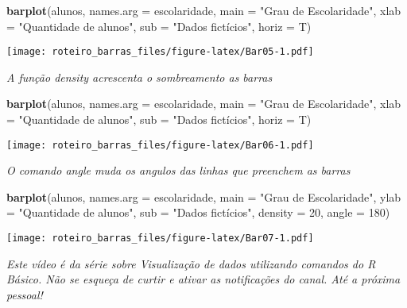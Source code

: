 \documentclass[]{article}
\newenvironment{Shaded}{\begin{snugshade}}{\end{snugshade}}
\newcommand{\DataTypeTok}[1]{\textcolor[rgb]{0.13,0.29,0.53}{#1}}
\newcommand{\DecValTok}[1]{\textcolor[rgb]{0.00,0.00,0.81}{#1}}
\newcommand{\KeywordTok}[1]{\textcolor[rgb]{0.13,0.29,0.53}{\textbf{#1}}}
\newcommand{\NormalTok}[1]{#1}
\newcommand{\StringTok}[1]{\textcolor[rgb]{0.31,0.60,0.02}{#1}}
\begin{document}
\begin{Shaded}
\begin{Highlighting}[]
\KeywordTok{barplot}\NormalTok{(alunos, }\DataTypeTok{names.arg =}\NormalTok{ escolaridade, }\DataTypeTok{main =} \StringTok{"Grau de Escolaridade"}\NormalTok{, }
        \DataTypeTok{xlab =} \StringTok{"Quantidade de alunos"}\NormalTok{, }\DataTypeTok{sub =} \StringTok{"Dados fictícios"}\NormalTok{, }\DataTypeTok{horiz =}\NormalTok{ T)}
\end{Highlighting}
\end{Shaded}

\texttt{[image: roteiro\_barras\_files/figure-latex/Bar05-1.pdf]}

\emph{A função density acrescenta o sombreamento as barras}

\begin{Shaded}
\begin{Highlighting}[]
\KeywordTok{barplot}\NormalTok{(alunos, }\DataTypeTok{names.arg =}\NormalTok{ escolaridade, }\DataTypeTok{main =} \StringTok{"Grau de Escolaridade"}\NormalTok{, }
        \DataTypeTok{xlab =} \StringTok{"Quantidade de alunos"}\NormalTok{, }\DataTypeTok{sub =} \StringTok{"Dados fictícios"}\NormalTok{, }\DataTypeTok{horiz =}\NormalTok{ T)}
\end{Highlighting}
\end{Shaded}

\texttt{[image: roteiro\_barras\_files/figure-latex/Bar06-1.pdf]}

\emph{O comando angle muda os angulos das linhas que preenchem as
barras}

\begin{Shaded}
\begin{Highlighting}[]
\KeywordTok{barplot}\NormalTok{(alunos, }\DataTypeTok{names.arg =}\NormalTok{ escolaridade, }\DataTypeTok{main =} \StringTok{"Grau de Escolaridade"}\NormalTok{, }
        \DataTypeTok{ylab =} \StringTok{"Quantidade de alunos"}\NormalTok{, }\DataTypeTok{sub =} \StringTok{"Dados fictícios"}\NormalTok{, }\DataTypeTok{density =} \DecValTok{20}\NormalTok{, }\DataTypeTok{angle =} \DecValTok{180}\NormalTok{)}
\end{Highlighting}
\end{Shaded}

\texttt{[image: roteiro\_barras\_files/figure-latex/Bar07-1.pdf]}

\emph{Este vídeo é da série sobre Visualização de dados utilizando
comandos do R Básico. Não se esqueça de curtir e ativar as notificações
do canal. Até a próxima pessoal!}
\end{document}
